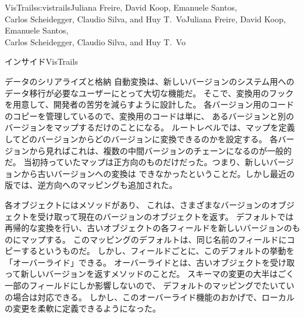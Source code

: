 \begin{aosachaptertoc}{VisTrails}{s:vistrails}{Juliana Freire, David Koop, Emanuele Santos, \\ Carlos Scheidegger, Claudio Silva, and Huy T.\ Vo}{Juliana Freire, David Koop, Emanuele Santos, \\ \hspace*{0.9cm} Carlos Scheidegger, Claudio Silva, and Huy T.\ Vo}
\begin{aosasect1}{インサイドVisTrails}
\begin{aosasect2}{データのシリアライズと格納}
自動変換は、新しいバージョンのシステム用へのデータ移行が必要なユーザーにとって大切な機能だ。
そこで、変換用のフックを用意して、開発者の苦労を減らすように設計した。
各バージョン用のコードのコピーを管理しているので、変換用のコードは単に、
あるバージョンと別のバージョンをマップするだけのことになる。
ルートレベルでは、マップを定義してどのバージョンからどのバージョンに変換できるのかを設定する。
各バージョンから見ればこれは、複数の中間バージョンのチェーンになるのが一般的だ。
当初持っていたマップは正方向のものだけだった。つまり、新しいバージョンから古いバージョンへの変換は
できなかったということだ。しかし最近の版では、逆方向へのマッピングも追加された。

各オブジェクトにはメソッドがあり、
これは、さまざまなバージョンのオブジェクトを受け取って現在のバージョンのオブジェクトを返す。
デフォルトでは再帰的な変換を行い、古いオブジェクトの各フィールドを新しいバージョンのものにマップする。
このマッピングのデフォルトは、同じ名前のフィールドにコピーするというものだ。
しかし、フィールドごとに、このデフォルトの挙動を「オーバーライド」できる。
オーバーライドとは、古いオブジェクトを受け取って新しいバージョンを返すメソッドのことだ。
スキーマの変更の大半はごく一部のフィールドにしか影響しないので、
デフォルトのマッピングでたいていの場合は対応できる。
しかし、このオーバーライド機能のおかげで、ローカルの変更を柔軟に定義できるようになった。


\end{aosasect2}
\end{aosasect1}
\end{aosachaptertoc}
